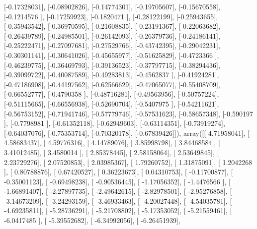 \documentclass{article}
\begin{document}
       [-0.17328031],
       [-0.08902826],
       [-0.14774301],
       [-0.19705607],
       [-0.15670558],
       [-0.1214576 ],
       [-0.17259923],
       [-0.1820471 ],
       [-0.28122199],
       [-0.25943655],
       [-0.35943542],
       [-0.36970595],
       [-0.21608835],
       [-0.23191367],
       [-0.22063682],
       [-0.26439789],
       [-0.24985501],
       [-0.26142093],
       [-0.26379736],
       [-0.24186141],
       [-0.25222471],
       [-0.27097681],
       [-0.27529766],
       [-0.43742395],
       [-0.29042231],
       [-0.30301141],
       [-0.30641026],
       [-0.45655977],
       [-0.51625829],
       [-0.4723366 ],
       [-0.46239775],
       [-0.36469793],
       [-0.39136523],
       [-0.37797715],
       [-0.38294436],
       [-0.39099722],
       [-0.40087589],
       [-0.49283813],
       [-0.4562837 ],
       [-0.41924281],
       [-0.47186908],
       [-0.44197562],
       [-0.62566629],
       [-0.47065077],
       [-0.55408709],
       [-0.66552777],
       [-0.4790358 ],
       [-0.48716281],
       [-0.49563956],
       [-0.50757224],
       [-0.51115665],
       [-0.66556938],
       [-0.52690704],
       [-0.5407975 ],
       [-0.54211621],
       [-0.56753152],
       [-0.71941746],
       [-0.57779746],
       [-0.57531623],
       [-0.58657348],
       [-0.590197  ],
       [-0.7798981 ],
       [-0.61352118],
       [-0.62949603],
       [-0.63114351],
       [-0.73919274],
       [-0.64037076],
       [-0.75353714],
       [-0.70320178],
       [-0.67839426]]), array([[  4.71958041],
       [  4.58683437],
       [  4.59776316],
       [  4.14789076],
       [  3.85998798],
       [  3.84468584],
       [  3.41012485],
       [  3.4580014 ],
       [  2.85378445],
       [  2.58158064],
       [  2.53649845],
       [  2.23729276],
       [  2.07520853],
       [  2.03985367],
       [  1.79260752],
       [  1.31875091],
       [  1.2042268 ],
       [  0.80788876],
       [  0.67420527],
       [  0.36223673],
       [  0.04310753],
       [ -0.11700877],
       [ -0.35001123],
       [ -0.69498238],
       [ -0.90536445],
       [ -1.17056352],
       [ -1.4476566 ],
       [ -1.66891407],
       [ -2.27897735],
       [ -2.49642615],
       [ -2.82978501],
       [ -2.95276858],
       [ -3.14673209],
       [ -3.24293159],
       [ -3.46933463],
       [ -4.20027448],
       [ -4.54035781],
       [ -4.69235811],
       [ -5.28736291],
       [ -5.21708802],
       [ -5.17353052],
       [ -5.21559461],
       [ -6.0417485 ],
       [ -5.39552682],
       [ -6.34992056],
       [ -6.26451939],
\end{document}
